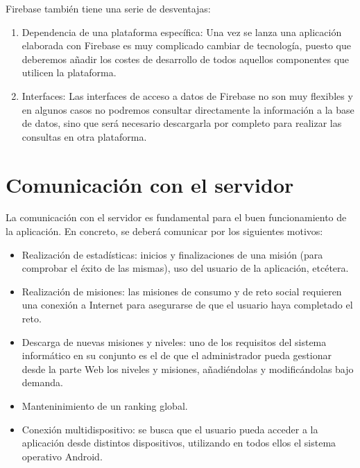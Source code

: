 \documentclass[twoside]{report}
\begin{document}
Firebase también tiene una serie de desventajas:

\begin{enumerate}
\item Dependencia de una plataforma específica: Una vez se lanza una aplicación elaborada con Firebase es muy complicado cambiar de tecnología, puesto que deberemos añadir los costes de desarrollo de todos aquellos componentes que utilicen la plataforma.

\item Interfaces: Las interfaces de acceso a datos de Firebase no son muy flexibles y en algunos casos no podremos consultar directamente la información a la base de datos, sino que será necesario descargarla por completo para realizar las consultas en otra plataforma.

\end{enumerate}

\section{Comunicación con el servidor}
La comunicación con el servidor es fundamental para el buen funcionamiento de la aplicación. En concreto, se deberá comunicar por los siguientes motivos:

\begin{itemize}
\item Realización de estadísticas: inicios y finalizaciones de una misión (para comprobar el éxito de las mismas), uso del usuario de la aplicación, etcétera.

\item Realización de misiones: las misiones de consumo y de reto social requieren una conexión a Internet para asegurarse de que el usuario haya completado el reto.

\item Descarga de nuevas misiones y niveles: uno de los requisitos del sistema informático en su conjunto es el de que el administrador pueda gestionar desde la parte Web los niveles y misiones, añadiéndolas y modificándolas bajo demanda.

\item Manteninimiento de un ranking global.

\item Conexión multidispositivo: se busca que el usuario pueda acceder a la aplicación desde distintos dispositivos, utilizando en todos ellos el sistema operativo Android.
\end{itemize}
\end{document}
